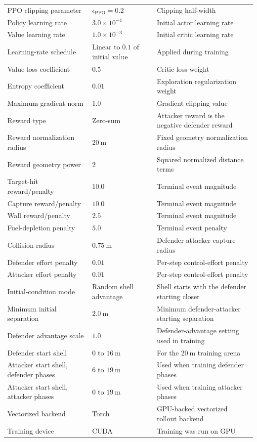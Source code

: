 \begin{longtable}{@{}p{}p{}p{}@{}}
PPO clipping parameter & $\epsilon_{\mathrm{PPO}}=0.2$ & Clipping half-width \\
Policy learning rate & $3.0\times10^{-4}$ & Initial actor learning rate \\
Value learning rate & $1.0\times10^{-3}$ & Initial critic learning rate \\
Learning-rate schedule & Linear to $0.1$ of initial value & Applied during training \\
Value loss coefficient & $0.5$ & Critic loss weight \\
Entropy coefficient & $0.01$ & Exploration regularization weight \\
Maximum gradient norm & $1.0$ & Gradient clipping value \\
Reward type & Zero-sum & Attacker reward is the negative defender reward \\
Reward normalization radius & $20~\mathrm{m}$ & Fixed geometry normalization radius \\
Reward geometry power & $2$ & Squared normalized distance terms \\
Target-hit reward/penalty & $10.0$ & Terminal event magnitude \\
Capture reward/penalty & $10.0$ & Terminal event magnitude \\
Wall reward/penalty & $2.5$ & Terminal event magnitude \\
Fuel-depletion penalty & $5.0$ & Terminal event penalty \\
Collision radius & $0.75~\mathrm{m}$ & Defender-attacker capture radius \\
Defender effort penalty & $0.01$ & Per-step control-effort penalty \\
Attacker effort penalty & $0.01$ & Per-step control-effort penalty \\
Initial-condition mode & Random shell advantage & Shell starts with the defender starting closer \\
Minimum initial separation & $2.0~\mathrm{m}$ & Minimum defender-attacker starting separation \\
Defender advantage scale & $1.0$ & Defender-advantage setting used in training \\
Defender start shell & $0$ to $16~\mathrm{m}$ & For the $20~\mathrm{m}$ training arena \\
Attacker start shell, defender phases & $6$ to $19~\mathrm{m}$ & Used when training defender phases \\
Attacker start shell, attacker phases & $0$ to $19~\mathrm{m}$ & Used when training attacker phases \\
Vectorized backend & Torch & GPU-backed vectorized rollout backend \\
Training device & CUDA & Training was run on GPU \\
\end{longtable}

